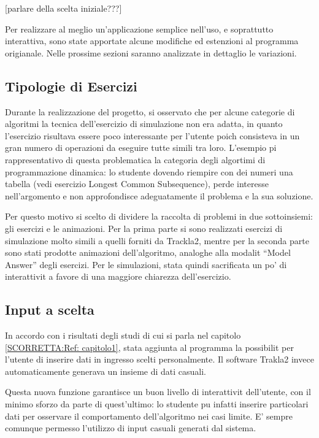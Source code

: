{[}parlare della scelta iniziale???{]}

Per realizzare al meglio un'applicazione semplice nell'uso, e soprattutto
interattiva, sono state apportate alcune modifiche ed estenzioni al
programma origianale. Nelle prossime sezioni saranno analizzate in
dettaglio le variazioni.


\subsection{Tipologie di Esercizi}

Durante la realizzazione del progetto, si  osservato che per alcune
categorie di algoritmi la tecnica dell'esercizio di simulazione non
era adatta, in quanto l'esercizio risultava essere poco interessante
per l'utente poich consisteva in un gran numero di operazioni da
eseguire tutte simili tra loro. L'esempio pi rappresentativo di questa
problematica  la categoria degli algortimi di programmazione dinamica:
lo studente dovendo riempire con dei numeri una tabella (vedi esercizio
Longest Common Subsequence), perde interesse nell'argomento e non
approfondisce adeguatamente il problema e la sua soluzione.

Per questo motivo si  scelto di dividere la raccolta di problemi
in due sottoinsiemi: gli esercizi e le animazioni. Per la prima parte
si sono realizzati esercizi di simulazione molto simili a quelli forniti
da Trackla2, mentre per la seconda parte sono stati prodotte animazioni
dell'algoritmo, analoghe alla modalit {}``Model Answer'' degli
esercizi. Per le simulazioni,  stata quindi sacrificata un po' di
interattivit a favore di una maggiore chiarezza dell'esercizio.


\subsection{\label{sub:Input-a-scelta}Input a scelta}

In accordo con i risultati degli studi di cui si parla nel capitolo
\ref{SCORRETTA:Ref: capitolo1},  stata aggiunta al programma la
possibilit per l'utente di inserire dati in ingresso scelti personalmente.
Il software Trakla2 invece automaticamente generava un insieme di
dati casuali.

Questa nuova funzione garantisce un buon livello di interattivit
dell'utente, con il minimo sforzo da parte di quest'ultimo: lo studente
pu infatti inserire particolari dati per osservare il comportamento
dell'algoritmo nei casi limite. E' sempre comunque permesso l'utilizzo
di input casuali generati dal sistema.

